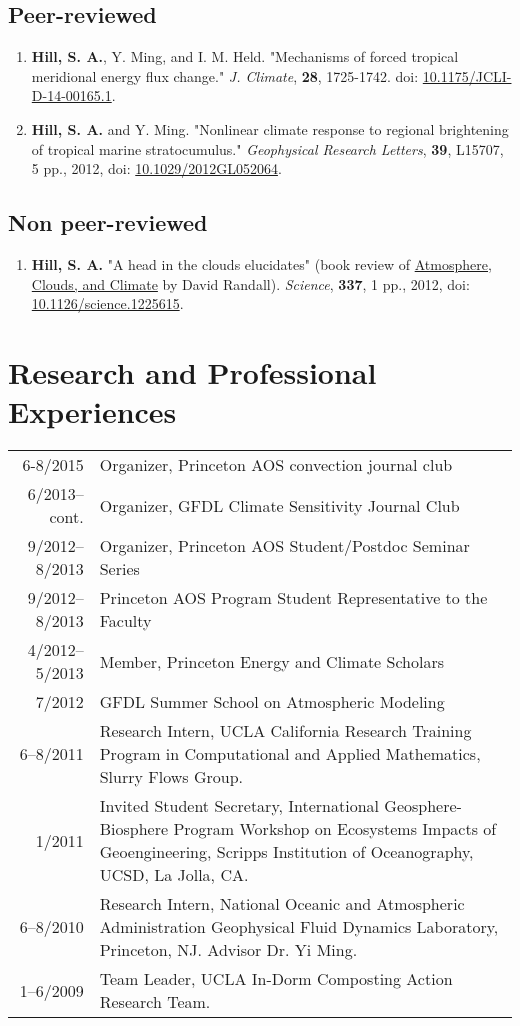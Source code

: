 \documentclass{article}
\begin{document}
\subsection*{Peer-reviewed}
\label{sec-2-3}
\begin{enumerate}
\item \textbf{Hill, S. A.}, Y. Ming, and I. M. Held. "Mechanisms of forced tropical
meridional energy flux change."  \emph{J. Climate}, \textbf{28}, 1725-1742.  doi:
\href{http://dx.doi.org/10.1175/JCLI-D-14-00165.1}{10.1175/JCLI-D-14-00165.1}.
\item \textbf{Hill, S. A.} and Y. Ming. "Nonlinear climate response to regional
brightening of tropical marine stratocumulus."  \emph{Geophysical Research Letters},
\textbf{39}, L15707, 5 pp., 2012, doi: \href{http://dx.doi.org/10.1029/2012GL052064}{10.1029/2012GL052064}.
\end{enumerate}
\subsection*{Non peer-reviewed}
\label{sec-2-4}
\begin{enumerate}
\item \textbf{Hill, S. A.} "A head in the clouds elucidates" (book review of
\href{http://press.princeton.edu/titles/9773.html}{Atmosphere, Clouds, and Climate} by David Randall). \emph{Science},
\textbf{337}, 1 pp., 2012, doi: \href{http://dx.doi.org/10.1126/science.1225615}{10.1126/science.1225615}.
\end{enumerate}
\section*{Research and Professional Experiences}
\label{sec-3}
\begin{center}
\begin{tabularx}{\textwidth}{rX}
6-8/2015 & Organizer, Princeton AOS convection journal club\\
6/2013–cont. & Organizer, GFDL Climate Sensitivity Journal Club\\
9/2012–8/2013 & Organizer, Princeton AOS Student/Postdoc Seminar Series\\
9/2012–8/2013 & Princeton AOS Program Student Representative to the Faculty\\
4/2012–5/2013 & Member, Princeton Energy and Climate Scholars\\
7/2012 & GFDL Summer School on Atmospheric Modeling\\
6–8/2011 & Research Intern, UCLA California Research Training Program in Computational and Applied Mathematics, Slurry Flows Group.\\
1/2011 & Invited Student Secretary, International Geosphere-Biosphere Program Workshop on Ecosystems Impacts of Geoengineering, Scripps Institution of Oceanography, UCSD, La Jolla, CA.\\
6–8/2010 & Research Intern, National Oceanic and Atmospheric Administration Geophysical Fluid Dynamics Laboratory, Princeton, NJ. Advisor Dr. Yi Ming.\\
1–6/2009 & Team Leader, UCLA In-Dorm Composting Action Research Team.\\
\end{tabularx}
\end{center}
\end{document}
